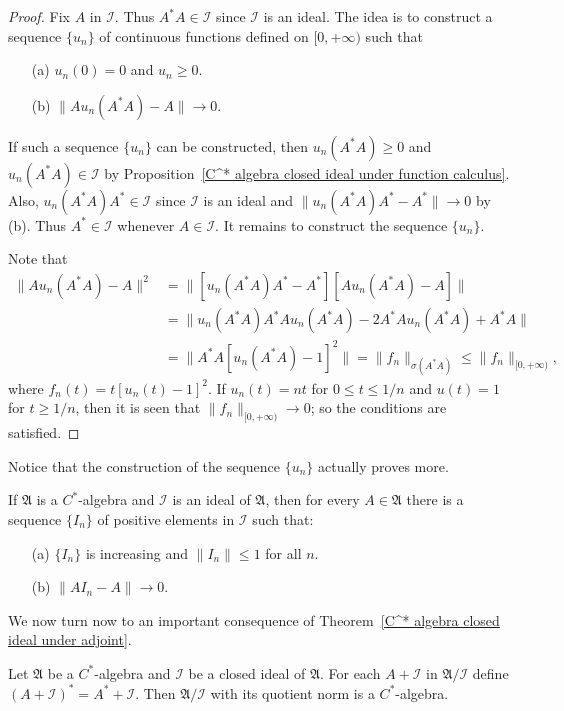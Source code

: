 \begin{proof}
Fix $A$ in $\mathscr{I}$. Thus $A^*A\in\mathscr{I}$ since $\mathscr{I}$ is an ideal. The idea is to construct a sequence $\{u_n\}$ of continuous functions defined on $[0,+\infty)$ such that
\begin{itemize}
\item[(a)] $u_n(0)=0$ and $u_n\geq 0$.
\item[(b)] $\|Au_n(A^*A)-A\|\to 0$.
\end{itemize}
If such a sequence $\{u_n\}$ can be constructed, then $u_n(A^*A)\geq 0$ and $u_n(A^*A)\in\mathscr{I}$ by Proposition~\ref{C^* algebra closed ideal under function calculus}. Also, $u_n(A^*A)A^*\in\mathscr{I}$ since $\mathscr{I}$ is an ideal and $\|u_n(A^*A)A^*-A^*\|\to 0$ by (b). Thus $A^*\in\mathscr{I}$ whenever $A\in\mathscr{I}$. It remains to construct the sequence $\{u_n\}$.\par
Note that
\begin{align*}
\|Au_n(A^*A)-A\|^2&=\|[u_n(A^*A)A^*-A^*][Au_n(A^*A)-A]\|\\
&=\|u_n(A^*A)A^*Au_n(A^*A)-2A^*Au_n(A^*A)+A^*A\|\\
&=\|A^*A[u_n(A^*A)-1]^2\|=\|f_n\|_{\sigma(A^*A)}\leq\|f_n\|_{[0,+\infty)},
\end{align*}
where $f_n(t)=t[u_n(t)-1]^2$. If $u_n(t)=nt$ for $0\leq t\leq 1/n$ and $u(t)=1$ for $t\geq 1/n$, then it is seen that $\|f_n\|_{[0,+\infty)}\to 0$; so the conditions are satisfied.
\end{proof}
Notice that the construction of the sequence $\{u_n\}$ actually proves more.
\begin{proposition}\label{C^* algebra local approximate identity}
If $\mathfrak{A}$ is a $C^*$-algebra and $\mathscr{I}$ is an ideal of $\mathfrak{A}$, then for every $A\in\mathfrak{A}$ there is a sequence $\{I_n\}$ of positive elements in $\mathscr{I}$ such that:
\begin{itemize}
\item[(a)] $\{I_n\}$ is increasing and $\|I_n\|\leq 1$ for all $n$.
\item[(b)] $\|AI_n-A\|\to 0$.
\end{itemize}
\end{proposition}
We now turn now to an important consequence of Theorem~\ref{C^* algebra closed ideal under adjoint}.
\begin{theorem}\label{C^* algebra quotient by closed ideal}
Let $\mathfrak{A}$ be a $C^*$-algebra and $\mathscr{I}$ be a closed ideal of $\mathfrak{A}$. For each $A+\mathscr{I}$ in $\mathfrak{A}/\mathscr{I}$ define $(A+\mathscr{I})^*=A^*+\mathscr{I}$. Then $\mathfrak{A}/\mathscr{I}$ with its quotient norm is a $C^*$-algebra.
\end{theorem}
